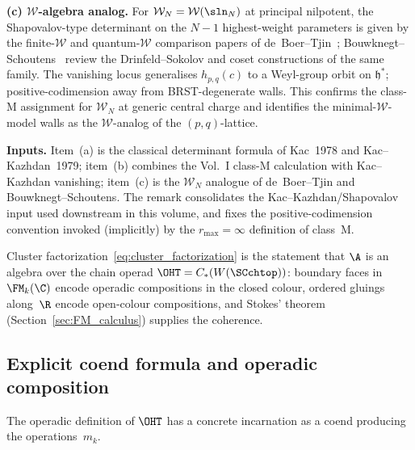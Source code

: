 \begin{remark}
\smallskip
\textbf{(c) $\mathcal W$-algebra analog.} For $\mathcal W_N = \mathcal W(\sln_N)$
at principal nilpotent, the Shapovalov-type determinant on the $N-1$ highest-weight parameters is
given by the finite-$\mathcal W$ and quantum-$\mathcal W$ comparison
papers of de~Boer--Tjin~\cite{deBoerTjin93,deBoerTjinRelation93};
Bouwknegt--Schoutens~\cite{BMP-Wsymmetry} review the
Drinfeld--Sokolov and coset constructions of the same family.
The vanishing locus generalises $h_{p,q}(c)$ to a Weyl-group orbit on
$\mathfrak h^\ast$; positive-codimension away from BRST-degenerate walls.
This confirms the class-M assignment for $\mathcal W_N$ at generic central
charge and identifies the minimal-$\mathcal W$-model walls as the
$\mathcal W$-analog of the $(p,q)$-lattice.

\smallskip
\textbf{Inputs.} Item~(a) is the classical determinant formula of
Kac~1978 and Kac--Kazhdan~1979; item~(b) combines the Vol.~I class-M
calculation with Kac--Kazhdan vanishing; item~(c) is the
$\mathcal W_N$ analogue of de~Boer--Tjin and Bouwknegt--Schoutens.
The remark consolidates the Kac--Kazhdan/Shapovalov input used
downstream in this volume, and fixes the positive-codimension
convention invoked (implicitly) by the $r_{\max}=\infty$ definition
of class~M.
\end{remark}

\begin{remark}
\label{rem:factorization-as-operadic-composition}
Cluster factorization~\eqref{eq:cluster_factorization} is the statement that $\A$ is an algebra over the chain operad $\OHT = C_\ast(W(\SCchtop))$: boundary faces in $\FM_k(\C)$ encode operadic compositions in the closed colour, ordered gluings along~$\R$ encode open-colour compositions, and Stokes' theorem (Section~\ref{sec:FM_calculus}) supplies the coherence.
\end{remark}

\subsection{Explicit coend formula and operadic composition}

The operadic definition of $\OHT$ has a concrete incarnation as a coend producing the operations~$m_k$.

